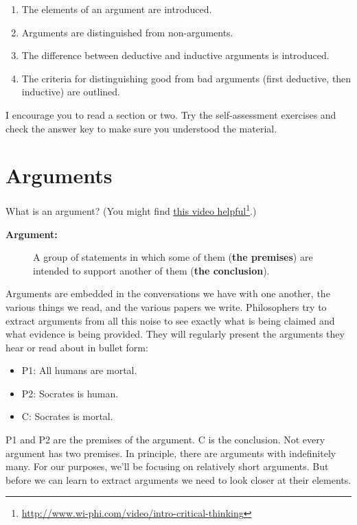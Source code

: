\documentclass[report,oneside]{memoir}
\begin{document}
\begin{enumerate}
\item The elements of an argument are introduced.

\item Arguments are distinguished from non-arguments.

\item The difference between deductive and inductive arguments is introduced.

\item The criteria for distinguishing good from bad arguments (first deductive, then inductive) are outlined.

\end{enumerate}
I encourage you to read a section or two. Try the self-assessment exercises and check the answer key to make sure you understood the material. 

\section{Arguments}
\label{arguments}

What is an argument? (You might find \href{http://www.wi-phi.com/video/intro-critical-thinking}{this video helpful}\footnote{\href{http://www.wi-phi.com/video/intro-critical-thinking}{http:/\slash www.wi-phi.com\slash video\slash intro-critical-thinking}}.)

\begin{description}

\item[\textbf{Argument:} ]

A group of statements in which some of them (\textbf{the premises}) are intended to support another of them (\textbf{the conclusion}).
\end{description}
Arguments are embedded in the conversations we have with one another, the various things we read, and the various papers we write. Philosophers try to extract arguments from all this noise to see exactly what is being claimed and what evidence is being provided. They will regularly present the arguments they hear or read about in bullet form: 

\begin{itemize}
\item P1: All humans are mortal.

\item P2: Socrates is human.

\item C: Socrates is mortal.

\end{itemize}
P1 and P2 are the premises of the argument. C is the conclusion. Not every argument has two premises. In principle, there are arguments with indefinitely many. For our purposes, we'll be focusing on relatively short arguments. But before we can learn to extract arguments we need to look closer at their elements. 
\end{document}
